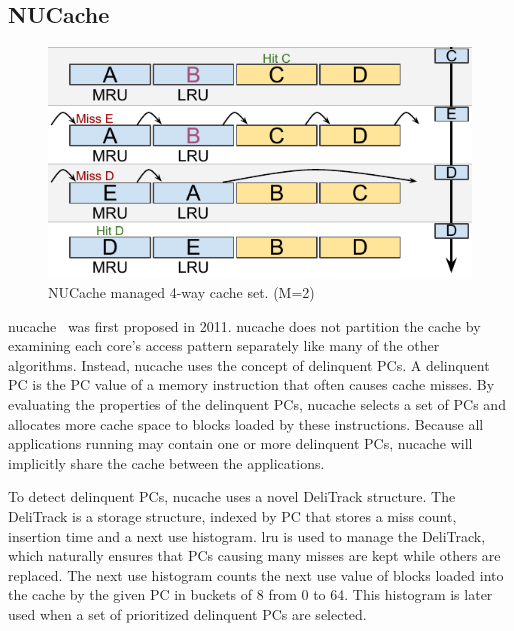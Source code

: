 
\subsection{NUCache}
\label{sec:algorithms:nucache}

\begin{figure}[th]
    \centering
    \includegraphics[width=.65\textwidth]{figures/algorithms/NUCache}
    \caption[NUCache managed 4-way cache set.]{NUCache managed 4-way cache set. (M=2)}
    \label{fig:algorithms:nucache_example}
\end{figure}

\gls{nucache}~\cite{Manikantan2011} was first proposed in 2011.
\gls{nucache} does not partition the cache by examining each core's access pattern separately like many of the other algorithms. 
Instead, \gls{nucache} uses the concept of delinquent PCs.
A delinquent PC is the PC value of a memory instruction that often causes cache misses.
By evaluating the properties of the delinquent PCs, \gls{nucache} selects a set of PCs and allocates more cache space to blocks loaded by these instructions.
Because all applications running may contain one or more delinquent PCs, \gls{nucache} will implicitly share the cache between the applications.

To detect delinquent PCs, \gls{nucache} uses a novel DeliTrack structure.
The DeliTrack is a storage structure, indexed by PC that stores a miss count, insertion time and a next use histogram. 
\gls{lru} is used to manage the DeliTrack, which naturally ensures that PCs causing many misses are kept while others are replaced.
The next use histogram counts the next use value of blocks loaded into the cache by the given PC in buckets of 8 from 0 to 64.
This histogram is later used when a set of prioritized delinquent PCs are selected.

